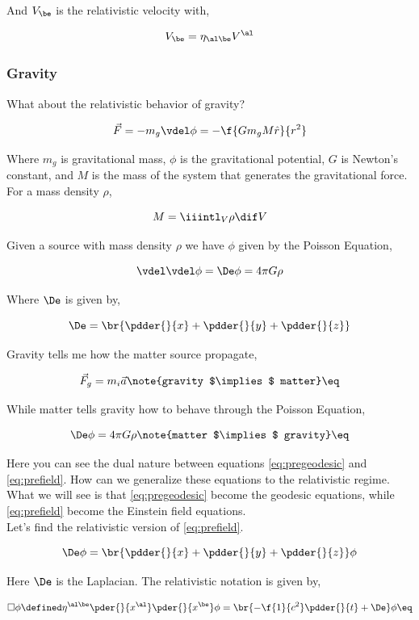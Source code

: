 \documentclass{article}
\begin{document}
And $V_\be$ is the relativistic velocity with,

\[  V_\be = \eta_{\al\be}V^\al \]

\subsubsection{Gravity}

What about the relativistic behavior of gravity?

\[ \vec{F} = - m_g \vdel \phi  = - \f{Gm_g M \hat{r}}{r^2}\]

Where $m_g$ is gravitational mass, $\phi$ is the gravitational potential, $G$ is Newton's constant, and $M$ is the mass of the system that generates the gravitational force. For a mass density $\rho$,

\[ M = \iiintl_{V} \rho \dif V \]

Given a source with mass density $\rho$ we have $\phi$ given by the Poisson Equation,

\[ \vdel \vdel \phi = \De \phi = 4\pi G\rho \]

Where $\De$ is given by,

\[ \De = \br{\pdder{}{x} + \pdder{}{y} + \pdder{}{z}} \]

Gravity tells me how the matter source propagate,

\[ \vec{F}_g  = m_i \vec{a} \note{gravity $\implies$ matter} \eq \label{eq:pregeodesic}\]

While matter tells gravity how to behave through the Poisson Equation,

\[ \De \phi = 4\pi G \rho \note{matter $\implies$ gravity} \eq \label{eq:prefield}\]

Here you can see the dual nature between equations \eqref{eq:pregeodesic} and \eqref{eq:prefield}. How can we generalize these equations to the relativistic regime. What we will see is that \eqref{eq:pregeodesic} become the geodesic equations, while \eqref{eq:prefield} become the Einstein field equations. \\

Let's find the relativistic version of \eqref{eq:prefield}.

\[ \De \phi = \br{\pdder{}{x} + \pdder{}{y} + \pdder{}{z} } \phi \]

Here $\De$ is the Laplacian. The relativistic notation is given by,

\[ \Box \phi \defined \eta^{\al\be} \pder{}{x^\al} \pder{}{x^\be} \phi = \br{-\f{1}{c^2}\pdder{}{t} + \De} \phi \eq \label{eq:alembert}\]
\end{document}
